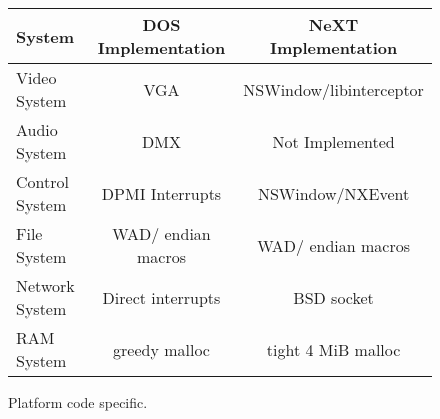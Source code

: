  \begin{figure}[H]
\centering  
\begin{tabularx}{\textwidth}{ L{0.22} C{0.39} C{0.39} }
  \toprule
  \textbf{System} & \textbf{DOS Implementation} & \textbf{NeXT Implementation}\\
  \toprule 
    Video System & VGA & NSWindow/libinterceptor\\
    Audio System & DMX & Not Implemented\\
    Control System & DPMI Interrupts & NSWindow/NXEvent \\
    File System & WAD/ endian macros & WAD/ endian macros\\
    Network System & Direct interrupts & BSD socket \\
    RAM System & greedy malloc & tight 4 MiB malloc\\
   \toprule
\end{tabularx}
\caption{Platform code specific.}
\end{figure}

\par

